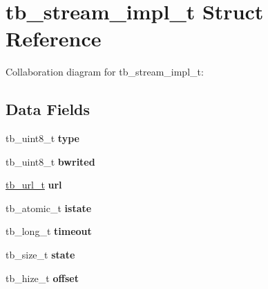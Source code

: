 \hypertarget{structtb__stream__impl__t}{\section{tb\-\_\-stream\-\_\-impl\-\_\-t Struct Reference}
\label{structtb__stream__impl__t}
}


Collaboration diagram for tb\-\_\-stream\-\_\-impl\-\_\-t\-:
\subsection*{Data Fields}
\begin{DoxyCompactItemize}
\item 
\hypertarget{structtb__stream__impl__t_a476d5ffdb2d41712dd5139da41f3a835}{tb\-\_\-uint8\-\_\-t {\bfseries type}}\label{structtb__stream__impl__t_a476d5ffdb2d41712dd5139da41f3a835}

\item 
\hypertarget{structtb__stream__impl__t_a97dd13418447070ff07136d67d6c1c2a}{tb\-\_\-uint8\-\_\-t {\bfseries bwrited}}\label{structtb__stream__impl__t_a97dd13418447070ff07136d67d6c1c2a}

\item 
\hypertarget{structtb__stream__impl__t_a3f9bc69b7e6e9240dfbf44bb49943b39}{\hyperlink{structtb__url__t}{tb\-\_\-url\-\_\-t} {\bfseries url}}\label{structtb__stream__impl__t_a3f9bc69b7e6e9240dfbf44bb49943b39}

\item 
\hypertarget{structtb__stream__impl__t_ab70a239788ff92ed9acdd34e39540007}{tb\-\_\-atomic\-\_\-t {\bfseries istate}}\label{structtb__stream__impl__t_ab70a239788ff92ed9acdd34e39540007}

\item 
\hypertarget{structtb__stream__impl__t_aa19ce534ffcc8b889fb0cdc54dac9de4}{tb\-\_\-long\-\_\-t {\bfseries timeout}}\label{structtb__stream__impl__t_aa19ce534ffcc8b889fb0cdc54dac9de4}

\item 
\hypertarget{structtb__stream__impl__t_a94e7387175603496021f0802de2267c0}{tb\-\_\-size\-\_\-t {\bfseries state}}\label{structtb__stream__impl__t_a94e7387175603496021f0802de2267c0}

\item 
\hypertarget{structtb__stream__impl__t_a478a597a121a3e2ec2f570c601a81abb}{tb\-\_\-hize\-\_\-t {\bfseries offset}}\label{structtb__stream__impl__t_a478a597a121a3e2ec2f570c601a81abb}


\end{DoxyCompactItemize}
